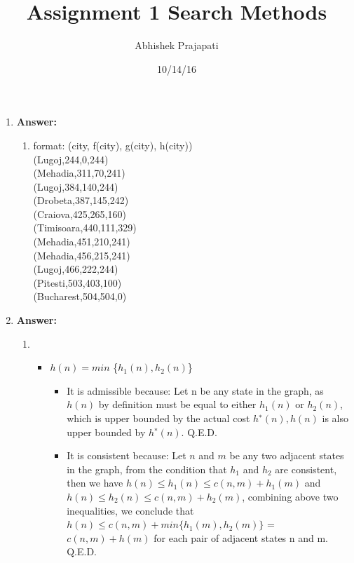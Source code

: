 \documentclass[12pt]{article}
\title{\bf Assignment 1 Search Methods}
\author{Abhishek Prajapati}
\date{10/14/16}
\begin{document}
\maketitle

\begin{enumerate}
\item


\textbf{Answer:}

\begin{enumerate}
    \item format: (city, f(city), g(city), h(city))\\
(Lugoj,244,0,244)\\ (Mehadia,311,70,241)\\ (Lugoj,384,140,244)\\ (Drobeta,387,145,242)\\ (Craiova,425,265,160)\\ (Timisoara,440,111,329)\\ (Mehadia,451,210,241)\\ (Mehadia,456,215,241)\\ (Lugoj,466,222,244)\\ (Pitesti,503,403,100)\\ (Bucharest,504,504,0)


\end{enumerate}

\item


\textbf{Answer:}

\begin{enumerate}
    \item
    \begin{itemize}
    \item $h(n) = min$ \{$h_1(n),h_2(n)$\}
    \begin{itemize}
        \item It is admissible because: Let n be any state in the graph, as $h(n)$ by definition must be equal to either $h_1(n)$ or $h_2(n)$, which is upper bounded by the actual cost $h^∗(n), h(n)$ is also upper bounded by $h^∗(n)$. Q.E.D.
        
        \item It is consistent because: Let $n$ and $m$ be any two adjacent states in the graph, from the condition that $h_1$ and $h_2$ are consistent, then we have $h(n) ≤ h_1(n) ≤ c(n, m) + h_1(m)$ and $h(n) \leq h_2(n) \leq c(n, m) + h_2(m)$, combining above two inequalities, we conclude that $h(n) ≤ c(n, m) + min\{h_1(m),h_2(m)\}$ = $c(n,m)+h(m)$ for each pair of adjacent states n and m. Q.E.D.
    \end{itemize}
    \end{itemize}
    

\end{enumerate}
\end{enumerate}
\end{document}
